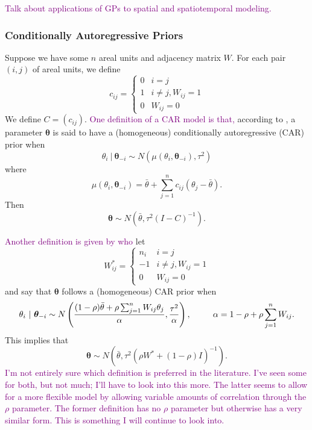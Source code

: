 \documentclass[twoside,12pt,bibstyle=chem-acs]{reedthesis}
\begin{document}
\textcolor{purple}{Talk about applications of GPs to spatial and spatiotemporal modeling.}

\subsubsection{Conditionally Autoregressive Priors}
Suppose we have some $n$ areal units and adjacency matrix $W$. For each pair $(i,j)$ of areal units, we define 
\begin{equation*}
c_{ij} = \begin{cases}
0 & i = j \\
1 & i\neq j, W_{ij} = 1 \\
0 & W_{ij} = 0
\end{cases}
\end{equation*}
We define $C = (c_{ij})$. \textcolor{purple}{One definition of a CAR model is that,} according to \citeauthor{cressie_statistics_2011}, a parameter $\bm\theta$ is said to have a (homogeneous) conditionally autoregressive (CAR) prior when
\begin{equation*}
\theta_i ~|~ \bm\theta_{-i} \sim N\left(\mu(\theta_i, \bm\theta_{-i}), \tau^2\right)
\end{equation*}
where
\begin{equation*}
\mu(\theta_i, \bm\theta_{-i}) = \bar\theta + \sum_{j = 1}^n c_{ij}(\theta_j - \bar\theta).
\end{equation*}
Then
\begin{equation*}
\bm\theta \sim N(\bar\theta, \tau^2(I-C)^{-1}).
\end{equation*}

\textcolor{purple}{Another definition is given by \citeauthor{halloran_estimation_2000} who} let 
\begin{equation*}
W^*_{ij} = \begin{cases}
n_i & i = j \\
-1 & i\neq j, W_{ij} = 1 \\
0 & W_{ij} = 0
\end{cases}
\end{equation*}
and say that $\bm\theta$ follows a (homogeneous) CAR prior when
\begin{equation*}
\theta_i ~|~ \bm\theta_{-i} \sim N\left(\frac{(1-\rho)\bar\theta + \rho\sum_{j=1}^nW_{ij}\theta_j}{\alpha}, \frac{\tau^2}{\alpha}\right), \hspace{0.075\linewidth} \alpha = 1-\rho+\rho\sum_{j=1}^nW_{ij}.
\end{equation*}
This implies that
\begin{equation*}
\bm\theta \sim N(\bar\theta, \tau^2(\rho W^* + (1-\rho)I)^{-1}).
\end{equation*}
\textcolor{purple}{I'm not entirely sure which definition is preferred in the literature. I've seen some for both, but not much; I'll have to look into this more. The latter seems to allow for a more flexible model by allowing variable amounts of correlation through the $\rho$ parameter. The former definition has no $\rho$ parameter but otherwise has a very similar form. This is something I will continue to look into.}
\end{document}
